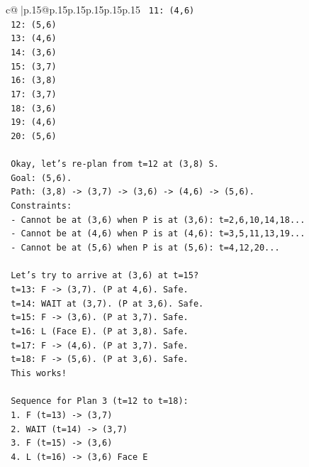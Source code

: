 \documentclass{article}
\begin{document}
{\begin{supertabular}{c@{$\;$}|p{.15\linewidth}@{}p{.15\linewidth}p{.15\linewidth}p{.15\linewidth}p{.15\linewidth}p{.15\linewidth}}
{{{\texttt{     11: (4,6)} \\
\texttt{     12: (5,6)} \\
\texttt{     13: (4,6)} \\
\texttt{     14: (3,6)} \\
\texttt{     15: (3,7)} \\
\texttt{     16: (3,8)} \\
\texttt{     17: (3,7)} \\
\texttt{     18: (3,6)} \\
\texttt{     19: (4,6)} \\
\texttt{     20: (5,6)} \\
\\ 
\texttt{     Okay, let's re{-}plan from t=12 at (3,8) S.} \\
\texttt{     Goal: (5,6).} \\
\texttt{     Path: (3,8) {-}> (3,7) {-}> (3,6) {-}> (4,6) {-}> (5,6).} \\
\texttt{     Constraints:} \\
\texttt{     {-} Cannot be at (3,6) when P is at (3,6): t=2,6,10,14,18...} \\
\texttt{     {-} Cannot be at (4,6) when P is at (4,6): t=3,5,11,13,19...} \\
\texttt{     {-} Cannot be at (5,6) when P is at (5,6): t=4,12,20...} \\
\\ 
\texttt{     Let's try to arrive at (3,6) at t=15?} \\
\texttt{     t=13: F {-}> (3,7). (P at 4,6). Safe.} \\
\texttt{     t=14: WAIT at (3,7). (P at 3,6). Safe.} \\
\texttt{     t=15: F {-}> (3,6). (P at 3,7). Safe.} \\
\texttt{     t=16: L (Face E). (P at 3,8). Safe.} \\
\texttt{     t=17: F {-}> (4,6). (P at 3,7). Safe.} \\
\texttt{     t=18: F {-}> (5,6). (P at 3,6). Safe.} \\
\texttt{     This works!} \\
\\ 
\texttt{     Sequence for Plan 3 (t=12 to t=18):} \\
\texttt{     1. F (t=13) {-}> (3,7)} \\
\texttt{     2. WAIT (t=14) {-}> (3,7)} \\
\texttt{     3. F (t=15) {-}> (3,6)} \\
\texttt{     4. L (t=16) {-}> (3,6) Face E} \\
}}}
\end{supertabular}}
\end{document}
